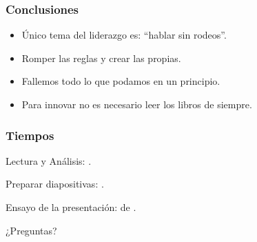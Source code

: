 \frame
{
\frametitle{Conclusiones}
\begin{itemize}
	\item Único tema del liderazgo es: ``hablar sin rodeos''.
	\item Romper las reglas y crear las propias.
	\item Fallemos todo lo que podamos en un principio.
	\item Para innovar no es necesario leer los libros de siempre.
\end{itemize}
}

\frame
{
\frametitle{Tiempos}
\begin{description}
    \item Lectura y Análisis: .
    \item Preparar diapositivas: .
    \item Ensayo de la presentación: de .
\end{description}
}
\frame
{
    \vspace{2cm}
    \begin{center}
        \Large{¿Preguntas?}
    \end{center}
}

